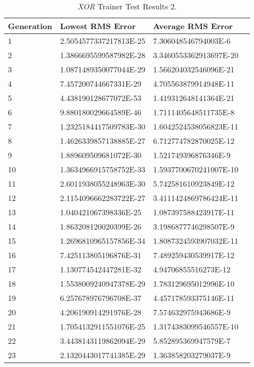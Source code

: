\begin{center}
    \begin{longtable}{ | l | l | l | l |}
      \caption{{\it XOR} Trainer Test Results 2.} \label{xor2} \\
    \hline
    Generation & Lowest RMS Error & Average RMS Error \\ \hline
1 &	2.5054577337217813E-25 &	7.306048546794003E-6 \\ \hline
2 &	1.3866695599587982E-28 &	3.3460553362913697E-20 \\ \hline
3 &	1.0871489350077044E-29 &	1.566204032546096E-21 \\ \hline
4 &	7.457200744667331E-29 &	4.705563879914948E-11 \\ \hline
5 &	4.438190128677072E-53 &	1.419312648141364E-21 \\ \hline
6 &	9.880180029664589E-46 &	1.7111405648511735E-8 \\ \hline
7 &	1.2325184417509783E-30 &	1.6042524538056823E-11 \\ \hline
8 &	1.4626339857138885E-27 &	6.712774782870025E-12 \\ \hline
9 &	1.889609509681072E-30 &	1.521749396876346E-9 \\ \hline
10 &	1.3634966915758752E-33 &	1.5937700670241007E-10 \\ \hline
11 &	2.6011938055248963E-30 &	5.742581610923849E-12 \\ \hline
12 &	2.1154096662283722E-27 &	3.4111424869786424E-11 \\ \hline
13 &	1.040421067398336E-25 &	1.087397588423917E-11 \\ \hline
14 &	1.863208120020399E-26 &	3.1986877746298507E-9 \\ \hline
15 &	1.2696810965157856E-34 &	1.8087324593907032E-11 \\ \hline
16 &	7.425113805196876E-31 &	7.489259430539917E-12 \\ \hline
17 &	1.130774542447281E-32 &	4.94706855516273E-12 \\ \hline
18 &	1.5538009240947378E-29 &	1.783129695012996E-10 \\ \hline
19 &	6.257678976796708E-37 &	4.457178593375146E-11 \\ \hline
20 &	4.206190914291976E-28 &	7.574632975943686E-9 \\ \hline
21 &	1.7054132911551076E-25 &	1.3174383099546557E-10 \\ \hline
22 &	3.4438143119862094E-29 &	5.852895369947579E-7 \\ \hline
23 &	2.1320443017741385E-29 &	1.363858203279037E-9 \\ \hline

\end{longtable}
\end{center}
